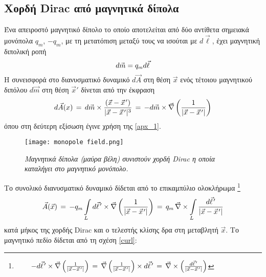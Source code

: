 \subsection{Xορδή Dirac από μαγνητικά δίπολα}
Ένα απειροστό μαγνητικό δίπολο το οποίο αποτελείται από δύο αντίθετα σημειακά μονόπολα $q_m$, $-q_m$, με τη μετατόπιση μεταξύ τους να ισούται με $d\vec{\ell}$, έχει μαγνητική διπολική ροπή
\begin{equation}
    d\vec{m} = q\subscr{m} d\vec{\ell}
\end{equation}
Η συνεισφορά στο διανυσματικό δυναμικό $d\vec{A}$ στη θέση $\vec{x}$ ενός τέτοιου μαγνητικού διπόλου $d\vec{m}$ στη θέση $\vec{x}'$ δίνεται από την έκφραση 
\begin{equation}\label{dipolecontr}
    d\vec{A}(x) \, = \, d\vec{m} \times \frac{(\vec{x}-\pvec{x}')}{|\vec{x}-\pvec{x}'|^3} \, = \, - d\vec{m}\times \vec{\nabla}\left( \frac{1}{|\vec{x}-\pvec{x}'|} \right)
\end{equation}
όπου στη δεύτερη εξίσωση έγινε χρήση της \eqref{apx_1}. 
\begin{figure}[t]
    \centering
    \texttt{[image: monopole field.png]}
    \caption{\textit{Μαγνητικά δίπολα (μαύρα βέλη) συνιστούν χορδή Dirac η οποία καταλήγει στο μαγνητικό μονόπολο.}}
    \label{fig:monopfield}
\end{figure}
Το συνολικό διανυσματικό δυναμικό δίδεται από το επικαμπύλιο ολοκλήρωμα \footnote{$\qquad- d\pvec{\ell}'\times \vec{\nabla}\left(\frac{1}{|\vec{x}-\pvec{x}'|}\right) \, = \, \vec{\nabla}\left(\frac{1}{|\vec{x}-\pvec{x}'|}\right) \times d\pvec{\ell}'\, = \, \vec{\nabla}\times\left(\frac{d\pvec{\ell}'}{|\vec{x}-\pvec{x}'|}\right)$
}
\begin{equation}\label{vectorpot}
    \vec{A}(\vec{x}) \, =  \, -q\subscr{m}\int\limits_L d\pvec{\ell}'\times \vec{\nabla}\left(\frac{1}{|\vec{x}-\pvec{x}'|}\right) \, = \, q\subscr{m}\,\vec{\nabla}\times \int\limits_L \frac{d\pvec{\ell}'}{|\vec{x}-\pvec{x}'|}
\end{equation}
κατά μήκος της χορδής Dirac και ο τελεστής κλίσης δρα στη μεταβλητή $\vec{x}$. Το μαγνητικό πεδίο 
δίδεται από τη σχέση \eqref{curl}:

